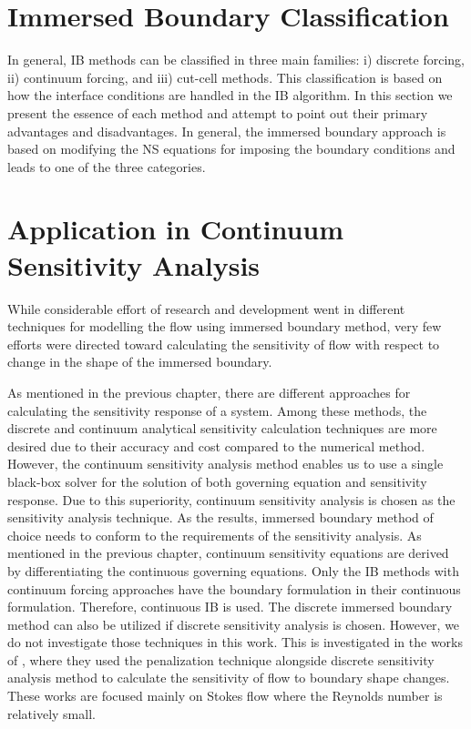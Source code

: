 \section{Immersed Boundary Classification}
In general, IB methods can be classified in three main families: i) discrete forcing, ii) continuum forcing, and iii) cut-cell methods. This classification is based on how the interface conditions are handled in the IB algorithm. In this section we present the essence of each method and attempt to point out their primary advantages and disadvantages. In general, the immersed boundary approach is based on modifying the NS equations for imposing the boundary conditions and leads to one of the three categories.


\section{Application in Continuum Sensitivity Analysis}
While considerable effort of research and development went in different techniques for modelling the flow using immersed boundary method, very few efforts were directed toward calculating the sensitivity of flow with respect to change in the shape of the immersed boundary.

As mentioned in the previous chapter, there are different approaches for calculating the sensitivity response of a system. Among these methods, the discrete and continuum analytical sensitivity calculation techniques are more desired due to their accuracy and cost compared to the numerical method. However, the continuum sensitivity analysis method enables us to use a single black-box solver for the solution of both governing equation and sensitivity response. Due to this superiority, continuum sensitivity analysis is chosen as the sensitivity analysis technique. As the results, immersed boundary method of choice needs to conform to the requirements of the sensitivity analysis. As mentioned in the previous chapter, continuum sensitivity equations are derived by differentiating the continuous governing equations. Only the IB methods with continuum forcing approaches have the boundary formulation in their continuous formulation. Therefore, continuous IB is used. The discrete immersed boundary method can also be utilized if discrete sensitivity analysis is chosen. However, we do not investigate those techniques in this work. This is investigated in the works of \cite{kreissl2011explicit, borrvall2003topology, challis2009level}, where they used the penalization technique alongside discrete sensitivity analysis method to calculate the sensitivity of flow to boundary shape changes. These works are focused mainly on Stokes flow where the Reynolds number is relatively small.

